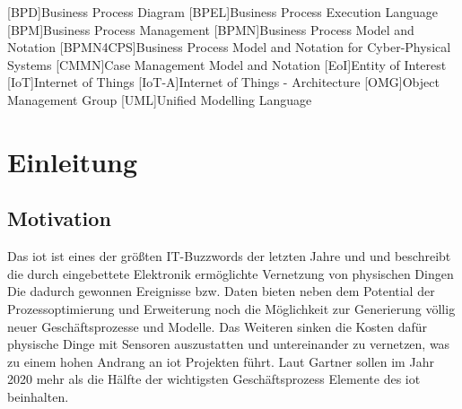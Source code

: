 \documentclass[a4paper, 12pt, twoside, headsepline=true]{scrartcl} %
\begin{document}
\tableofcontents
\clearpage
\newpage


\begin{acronym}[header=Abkürzungsverzeichnis]
	[BPD]{Business Process Diagram}
	[BPEL]{Business Process Execution Language}
	[BPM]{Business Process Management}
	[BPMN]{Business Process Model and Notation}
	[BPMN4CPS]{Business Process Model and Notation for Cyber-Physical Systems}
	[CMMN]{Case Management Model and Notation}
	[EoI]{Entity of Interest}
	[IoT]{Internet of Things}
	[IoT-A]{Internet of Things - Architecture}
	[OMG]{Object Management Group}
	[UML]{Unified Modelling Language}
\end{acronym}

\clearpage


\listoftables

\clearpage

\listoffigures
\clearpage


\section{Einleitung} \label{sec:section}

\subsection{Motivation} \label{sec:subsection}
Das \ac{iot} ist eines der größten IT-Buzzwords
der letzten Jahre und und beschreibt die durch eingebettete Elektronik ermöglichte Vernetzung von physischen Dingen
Die dadurch gewonnen Ereignisse bzw. Daten bieten neben dem Potential der
Prozessoptimierung und Erweiterung noch die Möglichkeit zur
Generierung völlig neuer Geschäftsprozesse und Modelle. 
Das Weiteren sinken die Kosten dafür physische Dinge mit Sensoren
auszustatten und untereinander zu vernetzen, was zu einem hohen
Andrang an \ac{iot} Projekten führt. Laut Gartner sollen im Jahr 2020
mehr als die Hälfte der wichtigsten Geschäftsprozess Elemente des \ac{iot}
beinhalten. 
\end{document}
